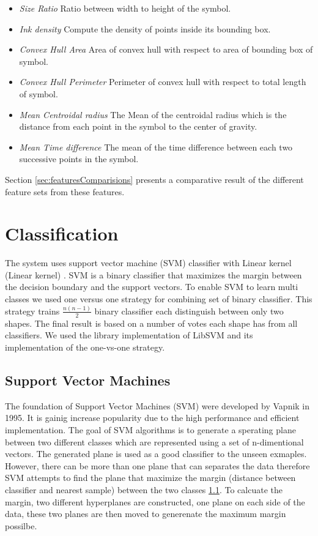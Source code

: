  	\begin{itemize}
\item \emph{Size Ratio} Ratio between width to height of the symbol.
	\item \emph{Ink density} Compute the density of points inside its bounding box\cite{GeometryAndDomain102}.   
 	\item \emph{Convex Hull Area} Area of convex hull with respect to area of bounding box of symbol.
	\item \emph{Convex Hull Perimeter} Perimeter of convex hull with respect to total length of symbol.
		\item \emph{Mean Centroidal radius} The Mean of the centroidal radius which is the distance from each point in the symbol to the center of gravity.
	
	\item \emph{Mean Time difference} The mean of the time difference between each two successive points in the symbol. %
  \end{itemize}
  
 Section \ref{sec:featuresComparisions} presents a comparative result of the different feature sets from these features.

\section{Classification}%
\label{sec:Classification}
The system uses support vector machine (SVM) classifier with Linear kernel (Linear kernel) \cite{libsvm}. SVM is a binary classifier that maximizes the margin between the decision boundary and the support vectors. To enable SVM to learn multi classes we used one versus one strategy for combining set of binary classifier. This strategy trains $ \frac{n(n-1)}{{2}}$ binary classifier each distinguish between only two shapes. The final result is based on a number of votes each shape has from all classifiers. We used the library implementation of LibSVM \cite{libsvm} and its implementation of the one-vs-one strategy.

\subsection{Support Vector Machines}

The foundation of Support Vector Machines (SVM) were developed by Vapnik \cite{} in 1995. It is gainig increase popularity due to the high performance and efficient implementation. The goal of SVM algorithms is to generate a sperating plane between two different classes which are represented using a set of n-dimentional vectors. The generated plane is used as a good classifier to the unseen exmaples. However, there can be more than one plane that can separates the data therefore SVM attempts to find the plane that maximize the margin (distance between classifier and nearest sample) between the two classes \ref{}. To calcuate the margin, two different hyperplanes are constructed, one plane on each side of the data, these two planes are then moved to generenate the maximum margin possilbe.  


